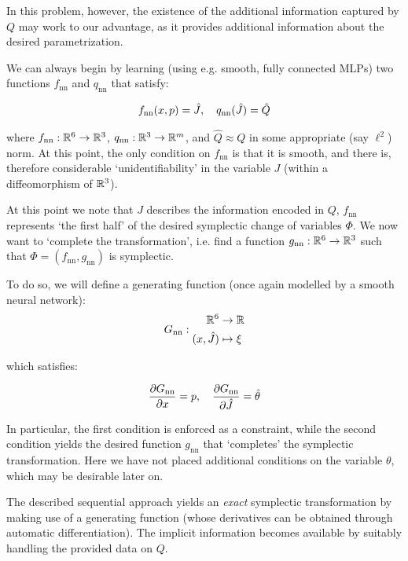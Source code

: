 \documentclass{article}
\begin{document}
In this problem, however, the existence of the additional information captured by $Q$ may work to our advantage, as it provides additional information about the desired parametrization. 

We can always begin by learning (using e.g. smooth, fully connected MLPs) two functions $f_\text{nn}$ and $q_\text{nn}$ that satisfy:

\begin{align*}
    f_\text{nn}(x,p)=\hat{J}\qc q_\text{nn}(\hat{J})=\hat{Q}
\end{align*}

where $f_\text{nn}:\mathbb{R}^6\to\mathbb{R}^3$, $q_\text{nn}:\mathbb{R}^3\to\mathbb{R}^m$, and $\hat{Q}\approx Q$ in some appropriate (say $\ell^2$) norm. At this point, the only condition on $f_\text{nn}$ is that it is smooth, and there is, therefore considerable `unidentifiability' in the variable $J$ (within a diffeomorphism of $\mathbb{R}^3$).

At this point we note that $J$ describes the information encoded in $Q$, $f_\text{nn}$ represents `the first half' of the desired symplectic change of variables $\Phi$. We now want to `complete the transformation', i.e. find a function $g_\text{nn}:\mathbb{R}^6\to\mathbb{R}^3$ such that $\Phi=(f_\text{nn},g_\text{nn})$ is symplectic.

To do so, we will define a generating function (once again modelled by a smooth neural network):
\begin{align*}
    G_\text{nn}:
    \begin{split}
        \mathbb{R}^6&\to\mathbb{R}\\
        (x,\hat{J})&\mapsto \xi
    \end{split}
\end{align*}

which satisfies:

\begin{align*}
    \pdv{G_\text{nn}}{x}=p\qc
    \pdv{G_\text{nn}}{\hat{J}}=\hat{\theta}
\end{align*}

In particular, the first condition is enforced as a constraint, while the second condition yields the desired function $g_\text{nn}$ that `completes' the symplectic transformation. Here we have not placed additional conditions on the variable $\theta$, which may be desirable later on.

The described sequential approach yields an \textit{exact} symplectic transformation by making use of a generating function (whose derivatives can be obtained through automatic differentiation). The implicit information becomes available by suitably handling the provided data on $Q$.
\end{document}
